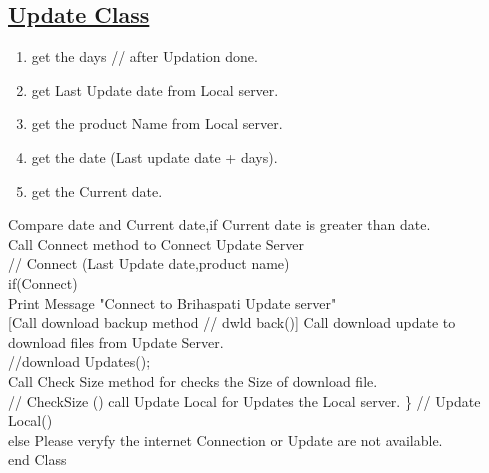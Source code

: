 \documentclass{article}
\begin{document}
\begin{center}

\subsection*{\underline{Update Class}}

\end{center}

\begin{enumerate}
                       \item get the days // after Updation done.\\
                       \item get Last Update date from Local server.\\
                       \item get the product Name from Local server.\\
                       \item get the date (Last update date + days).\\
                       \item get the Current date.\\

\end{enumerate}                
                               Compare date and Current date,if Current date is greater than date. \\
                               Call Connect method to Connect Update Server\\
                               // Connect (Last Update date,product name)  \\
                               if(Connect)\\
                               Print Message "Connect to Brihaspati Update server"\\

                               [Call download backup method  // dwld back()]
                             Call download update to download files from Update Server.\\
                               //download Updates();\\
                               Call Check Size method for checks the Size of download file.\\
                               // CheckSize ()
                               call Update Local for Updates the Local server.
                              \}
                               // Update Local()\\
                                  else
                                  Please veryfy the internet Connection or Update are not available.\\
                                  end Class\\
\end{document}

